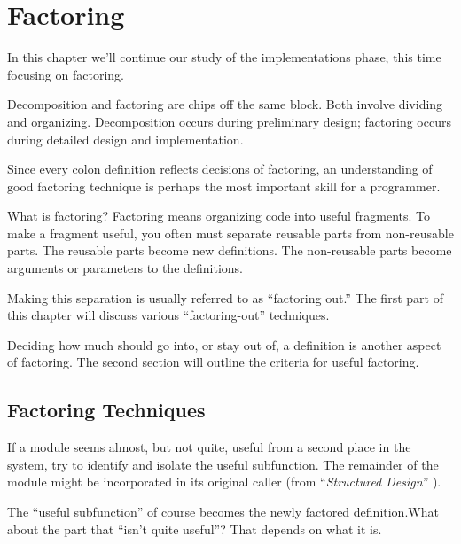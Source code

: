 
\chapter{Factoring}

\initial In this chapter we'll continue our study of the implementations phase,
this time focusing on factoring.

Decomposition and factoring are chips off the same block. Both involve
dividing and organizing. Decomposition occurs during preliminary
design; factoring occurs during detailed design and implementation.

Since every colon definition reflects decisions of factoring, an
understanding of good factoring technique is perhaps the most
important skill for a \Forth{} programmer.

What is factoring? Factoring means organizing code into useful
fragments. To make a fragment useful, you often must separate reusable
parts from non-reusable parts. The reusable parts become new
definitions. The non-reusable parts become arguments or parameters to the
definitions.

Making this separation is usually referred to as ``factoring out.''
The first part of this chapter will discuss various ``factoring-out''
techniques.

Deciding how much should go into, or stay out of, a definition is
another aspect of factoring. The second section will outline the
criteria for useful factoring.

\section{Factoring Techniques}

\begin{tfquot}
If a module seems almost, but not quite, useful from a second place in
the system, try to identify and isolate the useful subfunction. The
remainder of the module might be incorporated in its original caller
(from ``\emph{Structured Design}'' \cite{stevens74-6}).
\end{tfquot}
The ``useful subfunction'' of course becomes the newly factored
definition.What about the part that ``isn't quite useful''? That
depends on what it is.

